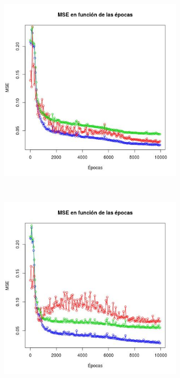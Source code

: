 \documentclass[12pt, a4paper]{article}
\begin{document}
 
 \begin{figure}
    \centering

    \begin{subfigure}[b]{0.45\textwidth}
        \includegraphics[width=\textwidth]{mse1b}
    \end{subfigure}
      ~ %
    \begin{subfigure}[b]{0.45\textwidth}
        \includegraphics[width=\textwidth]{mse1c}

\end{subfigure}
\end{figure}
\end{document}
